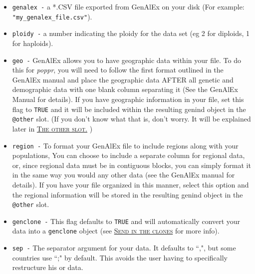 \documentclass[letterpaper]{article}\usepackage[]{graphicx}\usepackage[]{color}
\newcommand{\seclink}[2]{
  \textsc{\hyperref[#1]{#2}}
}
\newcommand{\poppr}{\textit{poppr}}
\begin{document}
\begin{itemize}
  \item \texttt{genalex -} a *.CSV file exported from GenAlEx on your disk (For example: \texttt{"my\_genalex\_file.csv"}).
  \item \texttt{ploidy -} a number indicating the ploidy for the data set (eg 2 for diploids, 1 for haploids).
  \item \texttt{geo -} GenAlEx allows you to have geographic data within your file. To do this for \poppr{}, you will need to follow the first format outlined in the GenAlEx manual and place the geographic data AFTER all genetic and demographic data with one blank column separating it (See the GenAlEx Manual for details). If you have geographic information in your file, set this flag to \texttt{TRUE} and it will be included within the resulting genind object in the \texttt{@other} slot. (If you don't know what that is, don't worry. It will be explained later in\seclink{intro:genind:other}{The other slot.})
  \item \texttt{region -} To format your GenAlEx file to include regions along with your populations, You can choose to include a separate column for regional data, or, since regional data must be in contiguous blocks, you can simply format it in the same way you would any other data (see the GenAlEx manual for details). If you have your file organized in this manner, select this option and the regional information will be stored in the resulting genind object in the \texttt{@other} slot.
  \item \texttt{genclone -} This flag defaults to \texttt{TRUE} and will automatically convert your data into a \texttt{genclone} object (see\seclink{intro:genclone}{Send in the clones}for more info).
  \item \texttt{sep -} The separator argument for your data. It defaults to ``,", but some countries use ``;" by default. This avoids the user having to
  specifically restructure his or data.
\end{itemize}

\begin{center}
\end{center}
\end{document}
